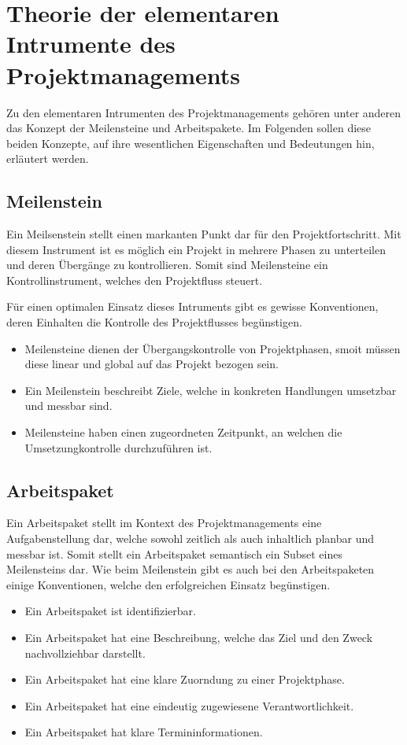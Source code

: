 \section{Theorie der elementaren Intrumente des Projektmanagements}
Zu den elementaren Intrumenten des Projektmanagements gehören unter
anderen das Konzept der Meilensteine und Arbeitspakete. Im Folgenden
sollen diese beiden Konzepte, auf ihre wesentlichen Eigenschaften und
Bedeutungen hin, erläutert werden.

\subsection{Meilenstein}
Ein Meilsenstein stellt einen markanten Punkt dar für den
Projektfortschritt. Mit diesem Instrument ist es möglich ein Projekt
in mehrere Phasen zu unterteilen und deren Übergänge zu kontrollieren.
Somit sind Meilensteine ein Kontrollinstrument, welches den
Projektfluss steuert.

Für einen optimalen Einsatz dieses Intruments gibt es gewisse
Konventionen, deren Einhalten die Kontrolle des Projektflusses
begünstigen.

\begin{itemize}
	\item Meilensteine dienen der Übergangskontrolle von
		Projektphasen, smoit müssen diese linear und
		global auf das Projekt bezogen sein.
	\item Ein Meilenstein beschreibt Ziele, welche in konkreten
		Handlungen umsetzbar und messbar sind.
	\item Meilensteine haben einen zugeordneten Zeitpunkt, an
		welchen die Umsetzungkontrolle durchzuführen ist.
\end{itemize}

\subsection{Arbeitspaket}
Ein Arbeitspaket stellt im Kontext des Projektmanagements eine
Aufgabenstellung dar, welche sowohl zeitlich als auch inhaltlich
planbar und messbar ist. Somit stellt ein Arbeitspaket semantisch ein
Subset eines Meilensteins dar. Wie beim Meilenstein gibt es auch bei
den Arbeitspaketen einige Konventionen, welche den erfolgreichen
Einsatz begünstigen.

\begin{itemize}
	\item Ein Arbeitspaket ist identifizierbar.
	\item Ein Arbeitspaket hat eine Beschreibung, welche das Ziel
		und den Zweck nachvollziehbar darstellt.
	\item Ein Arbeitspaket hat eine klare Zuorndung zu einer
		Projektphase.
	\item Ein Arbeitspaket hat eine eindeutig zugewiesene
		Verantwortlichkeit.
	\item Ein Arbeitspaket hat klare Termininformationen.
\end{itemize}

